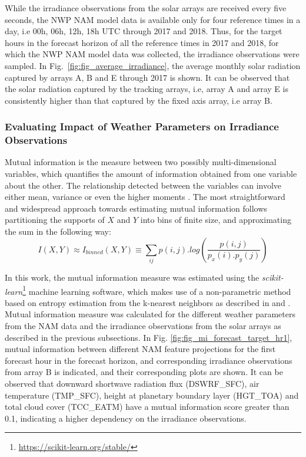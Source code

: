 While the irradiance observations from the solar arrays are received every five seconds, the NWP NAM model data is available only for four reference times in a day, i.e 00h, 06h, 12h, 18h UTC through 2017 and 2018. Thus, for the target hours in the forecast horizon of all the reference times in 2017 and 2018, for which the NWP NAM model data was collected, the irradiance observations were sampled. In Fig.~\ref{fig:fig_average_irradiance}, the average monthly solar radiation captured by arrays A, B and E through 2017 is shown. It can be observed that the solar radiation captured by the tracking arrays, i.e, array A and array E is consistently higher than that captured by the fixed axis array, i.e array B.

\subsubsection*{Evaluating Impact of Weather Parameters on Irradiance Observations}
\par Mutual information is the measure between two possibly multi-dimensional variables, which quantifies the amount of information obtained from one variable about the other. The relationship detected between the variables can involve either mean, variance or even the higher moments \cite{feature_selection_mi}. The most straightforward and widespread approach towards estimating mutual information follows partitioning the supports of $X$ and $Y$ into bins of finite size, and approximating the sum in the following way:
\begin{equation}\label{eq:eq_mi}
I(X, Y) \approx I_{binned}(X, Y) \equiv \sum_{ij} p(i, j) . log(\frac{p(i, j)}{p_x(i).p_y(j)})
\end{equation}

In this work, the mutual information measure was estimated using the \textit{scikit-learn}\footnote{\url{https://scikit-learn.org/stable/}} machine learning software, which makes use of a non-parametric method based on entropy estimation from the k-nearest neighbors as described in \cite{feature_selection_mi} and \cite{feature_selection_mi2}. Mutual information measure was calculated for the different weather parameters from the NAM data and the irradiance observations from the solar arrays as described in the previous subsections. In Fig. \ref{fig:fig_mi_forecast_target_hr1}, mutual information between different NAM feature projections for the first forecast hour in the forecast horizon, and corresponding irradiance observations from array B is indicated, and their corresponding plots are shown. It can be observed that downward shortwave radiation flux (DSWRF\_SFC), air temperature (TMP\_SFC), height at planetary boundary layer (HGT\_TOA) and total cloud cover (TCC\_EATM) have a mutual information score greater than 0.1, indicating a higher dependency on the irradiance observations. 

